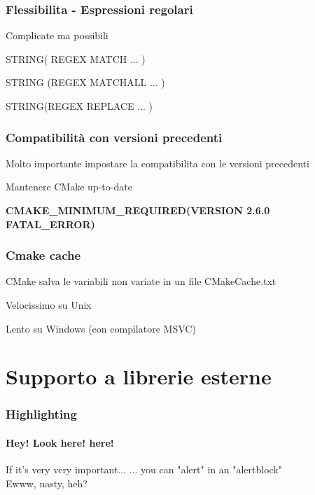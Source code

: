 \documentclass[12pt] {beamer}
\begin{document}
\begin{frame}
	\frametitle{Flessibilita - Espressioni regolari}
	Complicate ma possibili
	
	STRING( REGEX MATCH ... )
	
	STRING (REGEX MATCHALL ... )
	
	STRING(REGEX REPLACE ... )
	
\end{frame}

\begin{frame}
	\frametitle{Compatibilità con versioni precedenti}
	
	Molto importante impostare la compatibilita con le versioni precedenti
	
	Mantenere CMake up-to-date
	
	\textbf{CMAKE\_MINIMUM\_REQUIRED(VERSION 2.6.0 FATAL\_ERROR)}

\end{frame}

\begin{frame}
	\frametitle{Cmake cache}
	CMake salva le variabili non variate in un file CMakeCache.txt
	
	Velocissimo su Unix
	
	Lento su Windows (con compilatore MSVC)
\end{frame}

\section{Supporto a librerie esterne}
\begin{frame}
\frametitle{Highlighting}
\framesubtitle{Hey! Look here! here!}


\begin{alertblock}{If it's very very important...}
\alert{... you can "alert" in an "alertblock"}\\
Ewww, nasty, heh?
\end{alertblock}
\end{frame}
\end{document}
